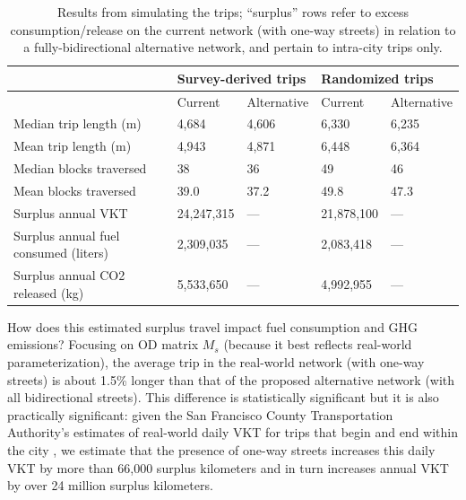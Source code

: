 \documentclass{trbunofficial}
\begin{document}
\begin{table}[tbp]
\centering
\caption{Results from simulating the trips; \enquote{surplus} rows refer to excess consumption/release on the current network (with one-way streets) in relation to a fully-bidirectional alternative network, and pertain to intra-city trips only.}
\label{tab:results}
\footnotesize
\begin{tabular}{lllll}
\toprule
& \multicolumn{2}{l}{Survey-derived trips} & \multicolumn{2}{l}{Randomized trips} \\
\midrule                                         
                                      & Current & Alternative & Current & Alternative    \\
\midrule
Median trip length (m)                & 4,684      & 4,606  & 6,330      & 6,235         \\
Mean trip length (m)                  & 4,943      & 4,871  & 6,448      & 6,364         \\
Median blocks traversed               & 38         & 36     & 49         & 46            \\
Mean blocks traversed                 & 39.0       & 37.2   & 49.8       & 47.3          \\
Surplus annual VKT                    & 24,247,315 & ---    & 21,878,100 & ---           \\
Surplus annual fuel consumed (liters) & 2,309,035  & ---    & 2,083,418  & ---           \\
Surplus annual CO2 released (kg)      & 5,533,650  & ---    & 4,992,955  & ---           \\
\bottomrule
\end{tabular}
\end{table}


How does this estimated surplus travel impact fuel consumption and GHG emissions? Focusing on OD matrix $M_s$ (because it best reflects real-world parameterization), the average trip in the real-world network (with one-way streets) is about 1.5\% longer than that of the proposed alternative network (with all bidirectional streets). This difference is statistically significant but it is also practically significant: given the San Francisco County Transportation Authority's estimates of real-world daily VKT for trips that begin and end within the city \cite{san_francisco_county_transportation_authority_tncs_2017}, we estimate that the presence of one-way streets increases this daily VKT by more than 66,000 surplus kilometers and in turn increases annual VKT by over 24 million surplus kilometers.
\end{document}
